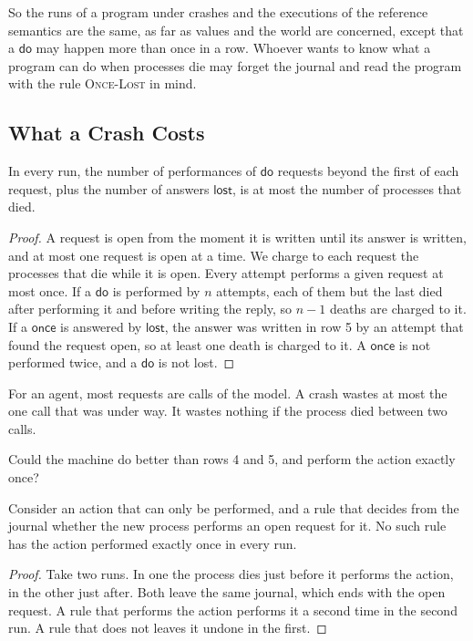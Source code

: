\documentclass[acmsmall,nonacm,screen]{acmart}
\newcommand{\kw}[1]{\mathsf{#1}}
\newcommand{\lost}{\kw{lost}}
\begin{document}
So the runs of a program under crashes and the executions of the reference semantics are the
same, as far as values and the world are concerned, except that a $\kw{do}$ may happen more
than once in a row. Whoever wants to know what a program can do when processes die may forget
the journal and read the program with the rule \textsc{Once-Lost} in mind.

\subsection{What a Crash Costs}

\begin{theorem}
\label{thm:cost}
In every run, the number of performances of $\kw{do}$ requests beyond the first of each
request, plus the number of answers $\lost$, is at most the number of processes that died.
\end{theorem}

\begin{proof}
A request is open from the moment it is written until its answer is written, and at most one
request is open at a time. We charge to each request the processes that die while it is open.
Every attempt performs a given request at most once. If a $\kw{do}$ is performed by $n$
attempts, each of them but the last died after performing it and before writing the reply, so
$n - 1$ deaths are charged to it. If a $\kw{once}$ is answered by $\lost$, the answer was
written in row 5 by an attempt that found the request open, so at least one death is charged
to it. A $\kw{once}$ is not performed twice, and a $\kw{do}$ is not lost.
\end{proof}

For an agent, most requests are calls of the model. A crash wastes at most the one call that
was under way. It wastes nothing if the process died between two calls.

Could the machine do better than rows 4 and 5, and perform the action exactly once?

\begin{proposition}
\label{prop:exactly}
Consider an action that can only be performed, and a rule that decides from the journal
whether the new process performs an open request for it. No such rule has the action
performed exactly once in every run.
\end{proposition}

\begin{proof}
Take two runs. In one the process dies just before it performs the action, in the other
just after. Both leave the same journal, which ends with the open request. A rule that
performs the action performs it a second time in the second run. A rule that does not leaves
it undone in the first.
\end{proof}
\end{document}

